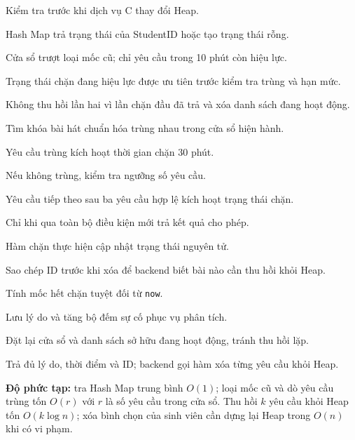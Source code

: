 \documentclass[12pt,a4paper,twoside,openright]{report}
\newcommand{\code}[1]{\texttt{#1}}
\begin{document}
\begin{description}[leftmargin=1.2cm,labelwidth=0.8cm,style=multiline,
  font=\ttfamily\bfseries,itemsep=2pt]
  \item[D1] Kiểm tra trước khi dịch vụ C thay đổi Heap.
  \item[D2] Hash Map trả trạng thái của StudentID hoặc tạo trạng thái rỗng.
  \item[D3] Cửa sổ trượt loại mốc cũ; chỉ yêu cầu trong 10 phút còn hiệu lực.
  \item[D4] Trạng thái chặn đang hiệu lực được ưu tiên trước kiểm tra trùng và hạn mức.
  \item[D5] Không thu hồi lần hai vì lần chặn đầu đã trả và xóa danh sách đang hoạt động.
  \item[D6] Tìm khóa bài hát chuẩn hóa trùng nhau trong cửa sổ hiện hành.
  \item[D7] Yêu cầu trùng kích hoạt thời gian chặn 30 phút.
  \item[D8] Nếu không trùng, kiểm tra ngưỡng số yêu cầu.
  \item[D9] Yêu cầu tiếp theo sau ba yêu cầu hợp lệ kích hoạt trạng thái chặn.
  \item[D10] Chỉ khi qua toàn bộ điều kiện mới trả kết quả cho phép.
  \item[D12] Hàm chặn thực hiện cập nhật trạng thái nguyên tử.
  \item[D13] Sao chép ID trước khi xóa để backend biết bài nào cần thu hồi khỏi Heap.
  \item[D14] Tính mốc hết chặn tuyệt đối từ \code{now}.
  \item[D15] Lưu lý do và tăng bộ đếm sự cố phục vụ phân tích.
  \item[D16] Đặt lại cửa sổ và danh sách sở hữu đang hoạt động, tránh thu hồi lặp.
  \item[D17] Trả đủ lý do, thời điểm và ID; backend gọi hàm xóa từng yêu cầu khỏi Heap.
\end{description}
\textbf{Độ phức tạp:} tra Hash Map trung bình $O(1)$; loại mốc cũ và dò yêu cầu trùng tốn
$O(r)$ với $r$ là số yêu cầu trong cửa sổ. Thu hồi $k$ yêu cầu khỏi Heap tốn $O(k\log n)$;
xóa bình chọn của sinh viên cần dựng lại Heap trong $O(n)$ khi có vi phạm.

\begingroup\footnotesize
\end{document}
